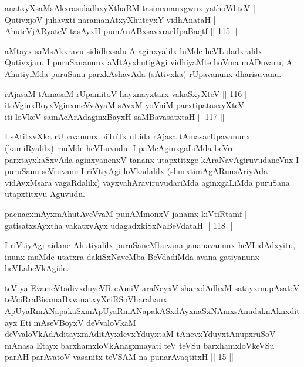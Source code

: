 \begin{shl}
anatxyXsaMsAkxrasidadhxyXthaRM tasimxnanxgwnx yathoVditeV | \\
QutivxjoV juhavxti naramanAtxyXhuteyxY vidhAnataH | \\
AhuteVjARyateV tasAyxH pumAnABxsavxrarUpaBaqtf \hfill|| 115 || 
\end{shl}

\begin{artha}
aMtayx saMsAkxravu sididhxsalu A aginxyalilx hiMde heVLidadxralilx
Qutivxjaru I puruSananunx aMtAyxhutigAgi vidhiyaMte hoVma mADuvaru, A
AhutiyiMda puruSanu parxkAshavAda (sAtivxka) rUpavanunx dharisuvanu.
\end{artha}

\begin{shl}
rAjasaM tAmasaM rUpamitoV hayxnayxtarx vakaSxyXteV \hfill|| 116 | \\
itoV\s ginxBoyxV\s ginxmeVvAyaM sAvxM yoVniM parxtipatasxyXteV | \\
iti loVkeV samAcArAdaginxBayxH saMBavasatxtaH \hfill|| 117 || 
\end{shl}

\begin{artha}
I sAtitxvXka rUpavanunx biTuTx uLida rAjasa tAmasarUpavanunx
(kamiRyalilx) muMde heVLuvudu. I paMcAginxgaLiMda beVre
parxtayxkaSxvAda aginxyanenxV tananx utapxtitxge kAraNavAgiruvudaneVnx I
puruSanu seVruvanu I riVtiyAgi loVkadalilx (shurxtimAgARnusAriyAda
vidAvxMsara vagaRdalilx) vayxvahAraviruvudariMda aginxgaLiMda puruSana
utapxtitxyu Aguvudu.
\end{artha}


\begin{shl}
pacnacxmAyxmAhutAveVvaM punAMmonxV janamx kiVtiRtamf | \\
gatisatxsAyxtha vakatxvAyx udagadxkiSxNaBeVdataH \hfill|| 118 || 
\end{shl}

\begin{artha}
I riVtiyAgi aidane Ahutiyalilx puruSaneMbuvana jananavanunx
heVLidAdxyitu, inunx muMde utatxra dakiSxNaveMba BeVdadiMda avana
gatiyanunx heVLabeVkAgide.
\end{artha}

\begin{shl}
teV ya EvameVtadivxduyeVR cAmiV araNeyxV sharxdAdhxM satayxmupAsateV teV\s ciRraBisamaBxvanatxyXciRSoV\s harahanx ApUyaRmANapakaSxmApUyaRmANapakASxdAyxnaSxNAmxsAnudaknAknxditayx Eti mAseVBoyxV deVvaloVkaM deVvaloVkAdAditayxmAditAyxdevxYduyxtaM tAnevxYduyxtAnupxruSoV mAnasa Etayx barxhamxloVkAnagxmayati teV teVSu barxhamxloVkeVSu parAH parAvatoV vasanitx teVSAM na punarAvaqtitxH || 15 ||
\end{shl}

